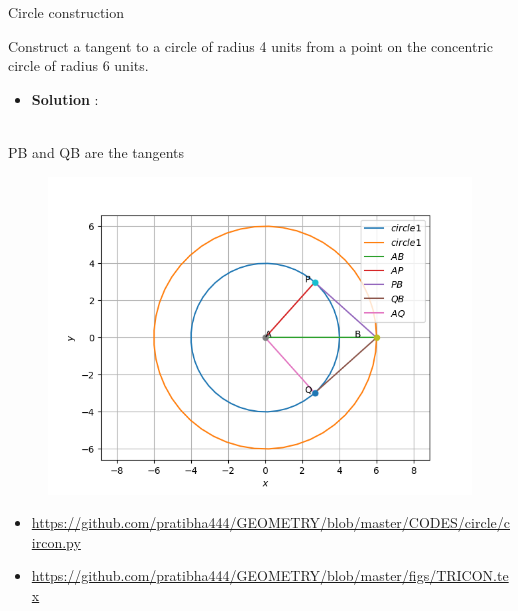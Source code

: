 \begin{frame}{Circle construction}

 Construct a tangent to a circle of radius 4 units
from a point on the concentric circle of radius
6 units.\\
\begin{itemize}
\item\textbf{Solution} :\\

\end{itemize}
\\  PB and QB are the tangents

\seti
\end{frame}
\begin{frame}
\begin{figure}
\includegraphics[scale=.4]{./CODES/circle/circon.png}
\end{figure}
\begin{itemize}
\item \url{https://github.com/pratibha444/GEOMETRY/blob/master/CODES/circle/circon.py}  \\
\item \url{https://github.com/pratibha444/GEOMETRY/blob/master/figs/TRICON.tex}
\end{itemize}
\end{frame}